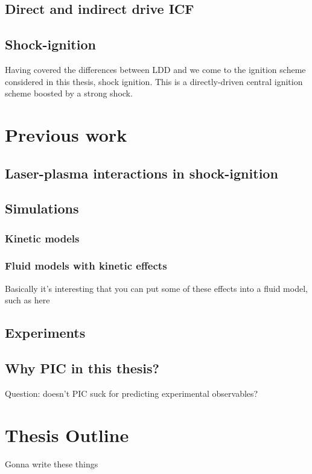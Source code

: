 \subsection{Direct and indirect drive ICF}

\subsection{Shock-ignition}
Having covered the differences between \acrshort{LDD} and  \citep{Ribeyre2009} we come to the ignition scheme considered in this thesis, shock ignition. This is a directly-driven central ignition scheme boosted by a strong shock.

\section{Previous work}
\subsection{Laser-plasma interactions in shock-ignition}
\subsection{Simulations}
\subsubsection{Kinetic models}
\subsubsection{Fluid models with kinetic effects}
Basically it's interesting that you can put some of these effects into a fluid model, such as here \citep{Tran2020}
\subsection{Experiments}

\subsection{Why PIC in this thesis?}
Question: doesn't PIC suck for predicting experimental observables? 

\section{Thesis Outline}
Gonna write these things

%
%
